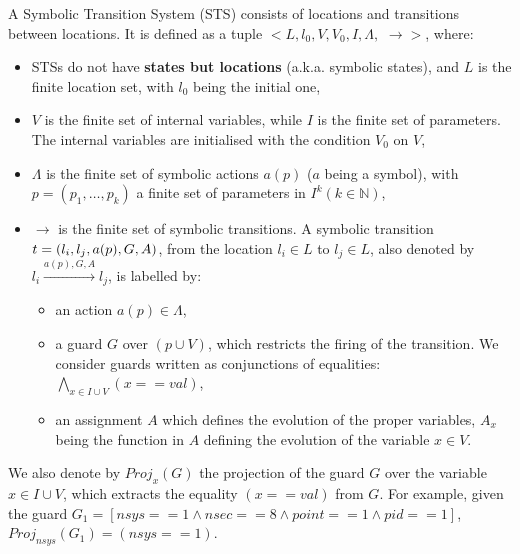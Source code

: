 \begin{definition}
	A Symbolic Transition System (STS) consists of locations and
    transitions between locations. It is defined as a tuple $<
    L,l_0,V,V_0,I,\Lambda,$ $\rightarrow>$, where:

	\begin{itemize}
        \item STSs do not have \textbf{states but locations}
        (a.k.a. symbolic states), and $L$ is the finite location
        set, with $l_0$ being the initial one,

        \item $V$ is the finite set of internal variables, while
        $I$ is the finite set of parameters. The internal
        variables are initialised with the condition $V_0$ on
        $V$,

        \item $\Lambda$ is the finite set of symbolic actions
        $a(p)$ ($a$ being a symbol), with $p=(p_1,\dots ,p_k)$ a
        finite set of parameters in $I^{k} (k \in \mathbb{N})$,

        \item $\rightarrow$ is the
        finite set of symbolic transitions. A symbolic transition
        $t = (l_i,l_j,a(p),G,\\A)$,
        from the location $l_i \in L$ to $l_j \in L$, also
        denoted by $l_i \xrightarrow{a(p),G,A} l_j$, is labelled by:

		\begin{itemize}
            \item an action $a(p) \in \Lambda$,

            \item a guard $G$ over $(p \cup V)$, which
            restricts the firing of the transition. We consider
            guards written as conjunctions of equalities:
            $\displaystyle \bigwedge_{x \in I \cup V} (x == val)$,

            \item an assignment $A$ which defines the evolution
            of the proper variables, $A_x$ being the function in
            $A$ defining the evolution of the variable $x \in V$.
		\end{itemize}
	\end{itemize}

	\label{def:sts}
\end{definition}

We also denote by $Proj_{x}(G)$ the projection of the guard $G$ over
the variable $x \in I \cup V$, which extracts the equality
$(x==val)$ from $G$. For example, given the guard $G_1 = [nsys==1
\wedge nsec==8 \wedge point==1 \wedge pid==1]$, $Proj_{nsys}(G_1)
= (nsys==1)$.

